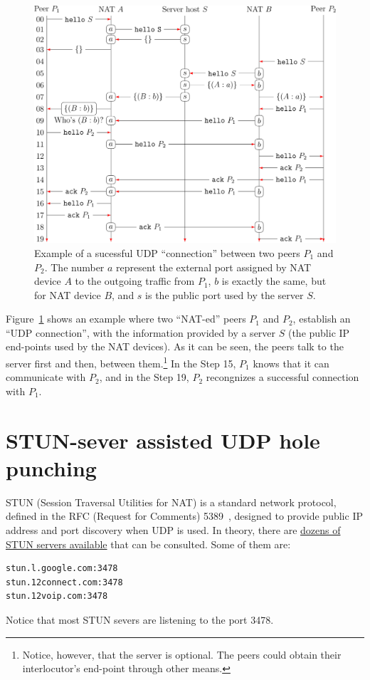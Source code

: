 \begin{figure}
  \includegraphics{graphics/UDP_Hole_Punching_RCN}
  \caption{Example of a sucessful UDP ``connection'' between two peers
    $P_1$ and $P_2$. The number $a$ represent the external port
    assigned by NAT device $A$ to the outgoing traffic from $P_1$,
    $b$ is exactly the same, but for NAT device $B$, and $s$ is the
    public port used by the server $S$.}
  \label{fig:UHP}
\end{figure}

Figure~\ref{fig:UHP} shows an example where two ``NAT-ed'' peers $P_1$
and $P_2$, establish an ``UDP connection'', with the information
provided by a server $S$ (the public IP end-points used by the NAT
devices). As it can be seen, the peers talk to the server first and
then, between them.\footnote{Notice, however, that the server is
  optional. The peers could obtain their interlocutor's end-point
  through other means.} In the Step 15, $P_1$ knows that it can
communicate with $P_2$, and in the Step 19, $P_2$ recongnizes a
successful connection with $P_1$.

\section{STUN-sever assisted UDP hole punching}

STUN (Session Traversal Utilities for NAT) is a standard network
protocol, defined in the RFC (Request for Comments) 5389~\cite{STUN},
designed to provide public IP address and port discovery when UDP is
used. In theory, there are
\href{https://gist.github.com/mondain/b0ec1cf5f60ae726202e}{dozens of
  STUN servers available} that can be consulted. Some of them are:
\begin{verbatim}
stun.l.google.com:3478
stun.12connect.com:3478
stun.12voip.com:3478
\end{verbatim}
Notice that most STUN severs are listening to the port 3478.

